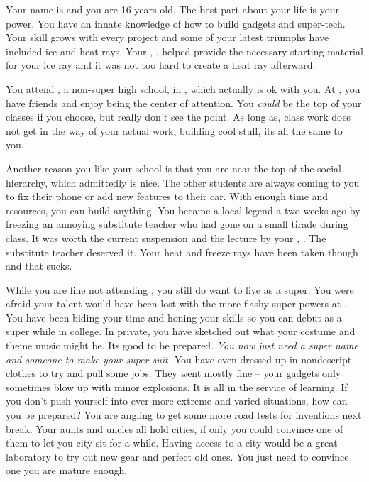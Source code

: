 \documentclass[char]{LRSguildcamp1}
\begin{document}
\name{\cTeen{}}



Your name is \cTeen{\intro} and you are 16 years old. The best part about your life is your power. You have an innate knowledge of how to build gadgets and super-tech. Your skill grows with every project and some of your latest triumphs have included ice and heat rays. Your \cOldest{\uncle}, \cOldest{}, helped provide the necessary starting material for your ice ray and it was not too hard to create a heat ray afterward. 

You attend \pNormalSchool{}, a non-super high school, in \pCityArchitect{}, which actually is ok with you. At \pNormalSchool{}, you have friends and enjoy being the center of attention. You \textsl{could} be the top of your classes if you choose, but really don't see the point. As long as, class work does not get in the way of your actual work, building cool stuff, its all the same to you. 

Another reason you like your school is that you are near the top of the social hierarchy, which admittedly is nice. The other students are always coming to you to fix their phone or add new features to their car. With enough time and resources, you can build anything. You became a local legend a two weeks ago by freezing an annoying substitute teacher who had gone on a small tirade during class. It was worth the current suspension and the lecture by your \cArchitect{\parent}, \cArchitect{}. The substitute teacher deserved it. Your heat and freeze rays have been taken though and that sucks. 

While you are fine not attending \pSuperSchool{}, you still do want to live as a super. You were afraid your talent would have been lost with the more flashy super powers at \pSuperSchool{}. You have been biding your time and honing your skills so you can debut as a super while in college. In private, you have sketched out what your costume and theme music might be. Its good to be prepared. \textit{You now just need a super name and someone to make your super suit.} You have even dressed up in nondescript clothes to try and pull some jobs. They went mostly fine -- your gadgets only sometimes blow up with minor explosions. It is all in the service of learning. If you don't push yourself into ever more extreme and varied situations, how can you be prepared? You are angling to get some more road tests for inventions next break. Your aunts and uncles all hold cities, if only you could convince one of them to let you city-sit for a while. Having access to a city would be a great laboratory to try out new gear and perfect old ones. You just need to convince one you are mature enough.
\end{document}
